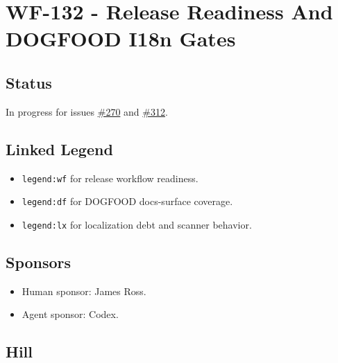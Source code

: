 \chapter{WF-132 - Release Readiness And DOGFOOD I18n Gates}\label{record-214}

\smallskip

\section{Status}\label{record-214-status}

In progress for issues \href{https://github.com/flyingrobots/bijou/issues/270}{\#270} and \href{https://github.com/flyingrobots/bijou/issues/312}{\#312}.

\section{Linked Legend}\label{record-214-linked-legend}

\begin{itemize}
\tightlist
\item
  \texttt{l\allowbreak{}e\allowbreak{}g\allowbreak{}e\allowbreak{}n\allowbreak{}d\allowbreak{}:\allowbreak{}w\allowbreak{}f} for release workflow readiness.
\item
  \texttt{l\allowbreak{}e\allowbreak{}g\allowbreak{}e\allowbreak{}n\allowbreak{}d\allowbreak{}:\allowbreak{}d\allowbreak{}f} for DOGFOOD docs-surface coverage.
\item
  \texttt{l\allowbreak{}e\allowbreak{}g\allowbreak{}e\allowbreak{}n\allowbreak{}d\allowbreak{}:\allowbreak{}l\allowbreak{}x} for localization debt and scanner behavior.
\end{itemize}

\section{Sponsors}\label{record-214-sponsors}

\begin{itemize}
\tightlist
\item
  Human sponsor: James Ross.
\item
  Agent sponsor: Codex.
\end{itemize}

\section{Hill}\label{record-214-hill}

